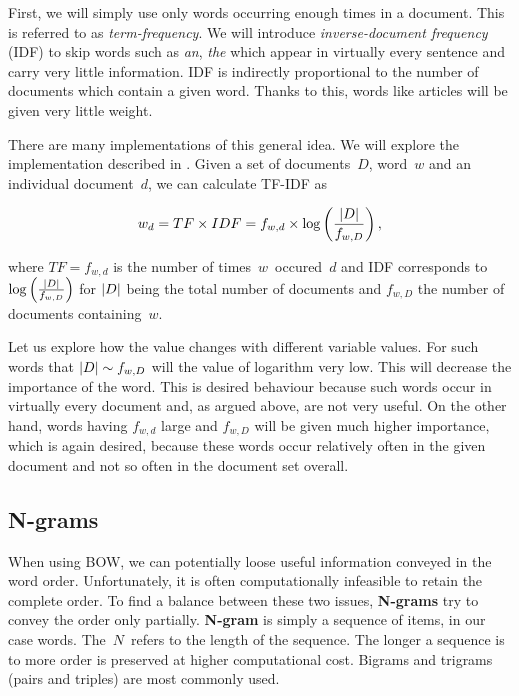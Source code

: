 First, we will simply use only words occurring enough times in a document. This is referred to as {\it term-frequency}.
We will introduce {\it inverse-document frequency} (IDF) to skip words such as {\it an}, {\it the} which appear in virtually every sentence and carry very little information.
IDF is indirectly proportional to the number of documents which contain a given word.
Thanks to this, words like articles will be given very little weight.

There are many implementations of this general idea. We will explore the implementation described in \citet{Ramos03}. Given a set of documents~$D$, word~$w$ and an individual document~$d$,
we can calculate TF-IDF as

\[
	w_d = TF \times IDF = f_{w, d} \times \log \left( {\left|{D}\right|\over f_{w,D}}  \right),
\]

where $TF = f_{w, d}$ is the number of times~$w$~occured~$d$ and IDF corresponds to $\log \left( {\left|{D}\right|\over f_{w,D}}  \right)$ for $\left|{D}\right|$ being the total number of documents and $f_{w, D}$ the number of documents containing~$w$.

Let us explore how the value changes with different variable values. For such words that $\left|{D}\right| \sim f_{w, D}$ will the value of logarithm very low. This will decrease the importance of the word. This is desired behaviour because such words occur in virtually every document and, as argued above, are not very useful. On the other hand, words having $f_{w,d}$ large and $f_{w,D}$ will be given much higher importance, which is again desired, because these words occur relatively often in the given document and not so often in the document set overall.



\subsection{N-grams}

When using BOW, we can potentially loose useful information conveyed in the word order.
Unfortunately, it is often computationally infeasible to retain the complete order.
To find a balance between these two issues, {\bf N-grams} try to convey the order only partially.
{\bf N-gram} is simply a sequence of items, in our case words. The~$N$~refers to the length of the sequence.
The longer a sequence is to more order is preserved at higher computational cost.
Bigrams and trigrams (pairs and triples) are most commonly used.

